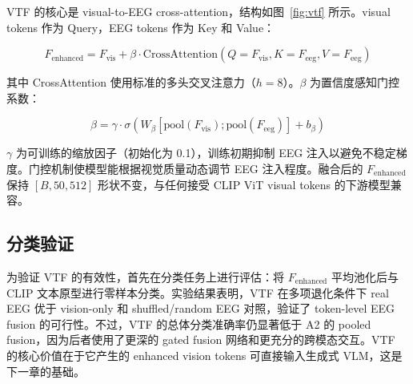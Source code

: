 VTF 的核心是 visual-to-EEG cross-attention，结构如图~\ref{fig:vtf} 所示。visual tokens 作为 Query，EEG tokens 作为 Key 和 Value：

\begin{equation}
  F_{\mathrm{enhanced}} = F_{\mathrm{vis}} + \beta \cdot \mathrm{CrossAttention}(Q=F_{\mathrm{vis}}, K=F_{\mathrm{eeg}}, V=F_{\mathrm{eeg}})
\end{equation}


其中 CrossAttention 使用标准的多头交叉注意力（$h=8$）。$\beta$ 为置信度感知门控系数：

\begin{equation}
  \beta = \gamma \cdot \sigma\left(W_\beta [\mathrm{pool}(F_{\mathrm{vis}}); \mathrm{pool}(F_{\mathrm{eeg}})] + b_\beta\right)
\end{equation}

$\gamma$ 为可训练的缩放因子（初始化为 0.1），训练初期抑制 EEG 注入以避免不稳定梯度。门控机制使模型能根据视觉质量动态调节 EEG 注入程度。融合后的 $F_{\mathrm{enhanced}}$ 保持 $[B, 50, 512]$ 形状不变，与任何接受 CLIP ViT visual tokens 的下游模型兼容。

\subsection{分类验证}

为验证 VTF 的有效性，首先在分类任务上进行评估：将 $F_{\mathrm{enhanced}}$ 平均池化后与 CLIP 文本原型进行零样本分类。实验结果表明，VTF 在多项退化条件下 real EEG 优于 vision-only 和 shuffled/random EEG 对照，验证了 token-level EEG fusion 的可行性。不过，VTF 的总体分类准确率仍显著低于 A2 的 pooled fusion，因为后者使用了更深的 gated fusion 网络和更充分的跨模态交互。VTF 的核心价值在于它产生的 enhanced vision tokens 可直接输入生成式 VLM，这是下一章的基础。
